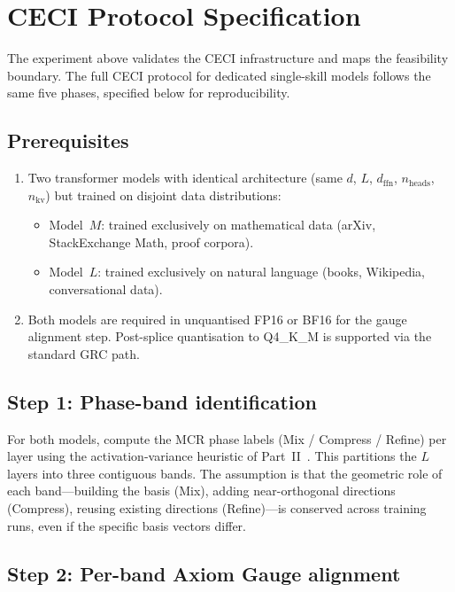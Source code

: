 \documentclass[11pt]{article}
\begin{document}
\section{CECI Protocol Specification}
\label{sec:protocol}

The experiment above validates the CECI infrastructure and maps the
feasibility boundary.  The full CECI protocol for dedicated single-skill
models follows the same five phases, specified below for reproducibility.

\subsection{Prerequisites}

\begin{enumerate}
\item Two transformer models with identical architecture (same $d$,
      $L$, $d_\mathrm{ffn}$, $n_\mathrm{heads}$, $n_\mathrm{kv}$)
      but trained on disjoint data distributions:
      \begin{itemize}
      \item Model~$M$: trained exclusively on mathematical data
            (arXiv, StackExchange Math, proof corpora).
      \item Model~$L$: trained exclusively on natural language
            (books, Wikipedia, conversational data).
      \end{itemize}
\item Both models are required in unquantised FP16 or BF16 for the
      gauge alignment step.  Post-splice quantisation to Q4\_K\_M is
      supported via the standard GRC path.
\end{enumerate}

\subsection{Step 1: Phase-band identification}

For both models, compute the MCR phase labels (Mix / Compress /
Refine) per layer using the activation-variance heuristic of
Part~II~\cite{stewart2026gp}.  This partitions the $L$ layers into
three contiguous bands.  The assumption is that the geometric role of
each band---building the basis (Mix), adding near-orthogonal directions
(Compress), reusing existing directions (Refine)---is conserved across
training runs, even if the specific basis vectors differ.

\subsection{Step 2: Per-band Axiom Gauge alignment}
\end{document}
